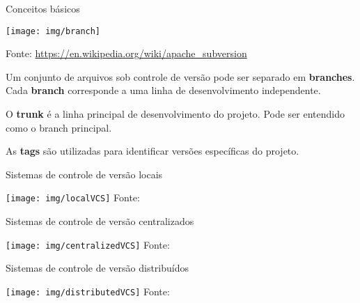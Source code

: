 \documentclass[a4paper]{beamer}
\begin{document}
\begin{frame}{Conceitos básicos}

\texttt{[image: img/branch]}\\
\begin{center}
{\scriptsize Fonte: \url{https://en.wikipedia.org/wiki/apache\_subversion}}
\end{center}

Um conjunto de arquivos sob controle de versão pode ser separado em \textbf{branches}. Cada \textbf{branch} corresponde a uma linha de desenvolvimento independente.
\pause

O \textbf{trunk} é a linha principal de desenvolvimento do projeto. Pode ser entendido como o branch principal.

\pause
As \textbf{tags} são utilizadas para identificar versões específicas do projeto.

\end{frame}

\begin{frame}{Sistemas de controle de versão locais}
\begin{center}
\texttt{[image: img/localVCS]}
\hspace{5pt}
{\scriptsize Fonte: \cite{proGit}}
\end{center}
\end{frame}

\begin{frame}{Sistemas de controle de versão centralizados}
\begin{center}
\texttt{[image: img/centralizedVCS]}
\hspace{5pt}
{\scriptsize Fonte: \cite{proGit}}
\end{center}\end{frame}

\begin{frame}{Sistemas de controle de versão distribuídos}
\begin{center}
\texttt{[image: img/distributedVCS]}
\hspace{5pt}
{\scriptsize Fonte: \cite{proGit}}
\end{center}
\end{frame}
\end{document}
